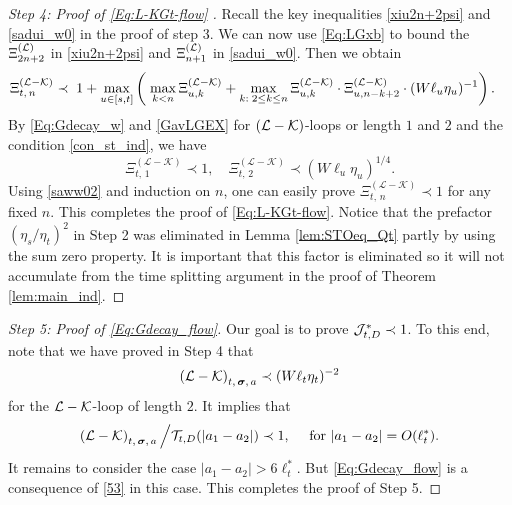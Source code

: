 \documentclass[10pt,reqno]{article}
\theoremstyle{plain} %
\theoremstyle{remark}
\numberwithin{equation}{section}
\begin{document}
\begin{proof}[Step 4: Proof of  \eqref{Eq:L-KGt-flow} ] 
 Recall the key inequalities \eqref{xiu2n+2psi} and  \eqref{sadui_w0} in the proof of step 3. 
We can now use \eqref{Eq:LGxb} to bound the $\Xi^{(\cal L)}_{2n+2}$ in \eqref{xiu2n+2psi} and $\Xi^{(\cal L)}_{n+1}$ in \eqref{sadui_w0}.    Then we obtain 
 \begin{align} \label{saww02}
 \Xi_{t,\,n }^{(\mathcal{L}-\mathcal{K})}  \prec\;  &\; 1+\max_{u\in [s,t]}
  \left(\; \max_{k<n }\Xi^{({\cal L-\cal K})}_{u,k}+\max_{k:\;2\le k\le n }\Xi^{({\cal L-\cal K})}_{u,k}\cdot \Xi^{({\cal L-\cal K})}_{u,n-k+2}\cdot(W\ell_u\eta_u)^{-1} \right).
\end{align}
 By   \eqref{Eq:Gdecay_w} and \eqref{GavLGEX}  for $(\cal L-\cal K)$-loops or length $1$ and $2$ and 
 the  condition \eqref{con_st_ind}, we have 
 $$
  \Xi_{t,\,1 }^{(\mathcal{L}-\mathcal{K})}\prec 1, \quad 
   \Xi_{t,\,2 }^{(\mathcal{L}-\mathcal{K})}\prec (W\ell_u\eta_u)^{1/4}.
 $$
Using  \eqref{saww02} and induction on $n$, one can easily prove   
 $ \Xi_{t,\,n }^{(\mathcal{L}-\mathcal{K})}\prec 1
 $ for any fixed $n$. This completes the proof of  \eqref{Eq:L-KGt-flow}. 
 Notice that the prefactor $(\eta_s/\eta_t)^2$  in Step 2 was eliminated in Lemma \ref{lem:STOeq_Qt}  partly by using the sum zero property. 
 It is important that this factor is eliminated so it will not  accumulate from    the time splitting argument  in the proof of Theorem \ref{lem:main_ind}.
\end{proof}
 
 
 
 

\begin{proof}[Step 5: Proof of \eqref{Eq:Gdecay_flow}]   
Our goal is to prove ${\cal J}^*_{t,D} \prec  1$. To this end,  note that 
we have  proved  in Step 4 that 
$$
\left({\cal L}-{\cal K}\right)_{t,\, \boldsymbol{\sigma},  \,\textbf{a}}\prec (W\ell_t\eta_t)^{-2} 
$$
for the ${\cal L}-{\cal K}$-loop of length $2$.  It implies that 
$$
 \left({\cal L}-{\cal K}\right)_{t,\, \boldsymbol{\sigma},  \,\textbf{a}}\Big/{\cal T}_{t, D}(|a_1-a_2|) \prec 1, \quad \text{ for } |a_1-a_2|=O(\ell_t^*).
$$
It remains to consider  the case $|a_1-a_2| > 6 \ell_t^*$. But \eqref{Eq:Gdecay_flow} is a consequence of \eqref{53} in this case. 
This completes the proof of Step 5. 

\end{proof}

 
\end{document}
